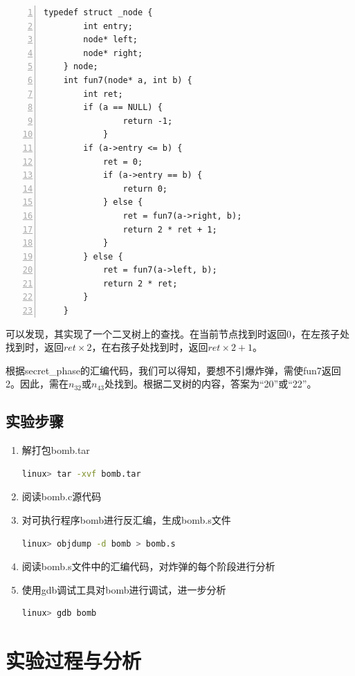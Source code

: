 \documentclass{article}
\begin{document}
\begin{lstlisting}[title = 与fun7等效的C代码, xleftmargin = 2em,xrightmargin = 2em, aboveskip = 1em, numbers = left, basicstyle=\small\ttfamily]
    typedef struct _node {
        int entry;
        node* left;
        node* right;
    } node;
    int fun7(node* a, int b) {
        int ret;
        if (a == NULL) {
                return -1;
            }
        if (a->entry <= b) {
            ret = 0;
            if (a->entry == b) {
                return 0;
            } else {
                ret = fun7(a->right, b);
                return 2 * ret + 1;
            }
        } else {
            ret = fun7(a->left, b);
            return 2 * ret;
        }   
    }
  \end{lstlisting}

可以发现，其实现了一个二叉树上的查找。在当前节点找到时返回0，在左孩子处找到时，返回$ret\times 2$，在右孩子处找到时，返回$ret \times 2 + 1$。

根据secret\_phase的汇编代码，我们可以得知，要想不引爆炸弹，需使fun7返回2。因此，需在$n_{32}$或$n_{43}$处找到。根据二叉树的内容，答案为“20”或“22”。
\normalsize
\subsection{实验步骤}
\large
\begin{enumerate}[1)]
  \item 解打包bomb.tar
        \begin{lstlisting}[language=bash]
    linux> tar -xvf bomb.tar
    \end{lstlisting}
  \item 阅读bomb.c源代码
  \item 对可执行程序bomb进行反汇编，生成bomb.s文件
        \begin{lstlisting}[language=bash]
    linux> objdump -d bomb > bomb.s
    \end{lstlisting}
  \item 阅读bomb.s文件中的汇编代码，对炸弹的每个阶段进行分析
  \item 使用gdb调试工具对bomb进行调试，进一步分析
        \begin{lstlisting}[language=bash]
    linux> gdb bomb
    \end{lstlisting}
\end{enumerate}
\normalsize
\section{实验过程与分析}
\large
\end{document}
